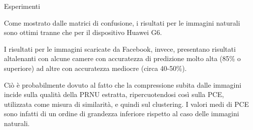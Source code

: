 \begin{tframe}{Esperimenti}

Come mostrato dalle matrici di confusione, i risultati per le immagini naturali sono ottimi tranne che per il dispositivo Huawei G6.

\vspace{0.1in}

I risultati per le immagini scaricate da Facebook, invece, presentano risultati altalenanti con alcune camere con accuratezza di predizione molto alta (85\% o superiore) ad altre con accuratezza mediocre (circa 40-50\%). 

\vspace{0.1in}

Ciò è probabilmente dovuto al fatto che la compressione subita dalle immagini incide sulla qualità della PRNU estratta, ripercuotendosi così sulla PCE, utilizzata come misura di similarità, e quindi sul clustering. I valori medi di PCE sono infatti di un ordine di grandezza inferiore rispetto al caso delle immagini naturali.

\end{tframe}